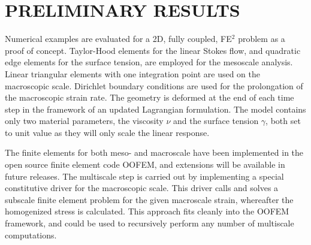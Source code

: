 \documentclass{nordic}
\begin{document}

\section{PRELIMINARY RESULTS}
Numerical examples are evaluated for a 2D, fully coupled, FE$^2$ problem as a proof of concept.
Taylor-Hood elements for the linear Stokes flow, and quadratic edge elements for the surface tension, are employed for the mesoscale analysis.
Linear triangular elements with one integration point are used on the macroscopic scale.
Dirichlet boundary conditions are used for the prolongation of the macroscopic strain rate.
The geometry is deformed at the end of each time step in the framework of an updated Lagrangian formulation.
The model contains only two material parameters, the viscosity $\nu$ and the surface tension $\gamma$,
both set to unit value as they will only scale the linear response.

The finite elements for both meso- and macroscale have been implemented in the open source finite element code OOFEM\cite{OOFEM},
and extensions will be available in future releases. The multiscale step is carried out by implementing a special constitutive driver for the macroscopic scale.
This driver calls and solves a subscale finite element problem for the given macroscale strain, whereafter the homogenized stress is calculated.
This approach fits cleanly into the OOFEM framework, and could be used to recursively perform any number of multiscale computations.
\end{document}
